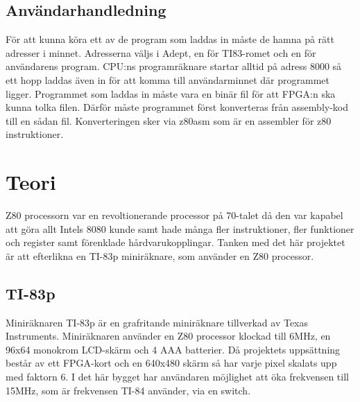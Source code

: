 \documentclass{article}
\begin{document}
\subsection{Användarhandledning}
För att kunna köra ett av de program som laddas in måste de hamna på rätt adresser i minnet. Adresserna väljs i Adept, en för TI83-romet och en för användarens program. CPU:ns programräknare startar alltid på adress 8000 så ett hopp laddas även in för att komma till användarminnet där programmet ligger. Programmet som laddas in måste vara en binär fil för att FPGA:n ska kunna tolka filen. Därför måste programmet först konverteras från assembly-kod till en sådan fil. Konverteringen sker via z80asm som är en assembler för z80 instruktioner.

\clearpage
\section{Teori}
Z80 processorn var en revoltionerande processor på 70-talet då den var kapabel att göra allt Intels 8080 kunde samt hade många fler instruktioner, fler funktioner och register samt förenklade hårdvarukopplingar. Tanken med det här projektet är att efterlikna en TI-83p miniräknare, som använder en Z80 processor.
\subsection{TI-83p}
Miniräknaren TI-83p är en grafritande miniräknare tillverkad av Texas Instruments. Miniräknaren använder en Z80 processor klockad till 6MHz, en 96x64 monokrom LCD-skärm och 4 AAA batterier. Då projektets uppsättning består av ett FPGA-kort och en 640x480 skärm så har varje pixel skalats upp med faktorn 6. I det här bygget har användaren möjlighet att öka frekvensen till 15MHz, som är frekvensen TI-84 använder, via en switch.
\end{document}
